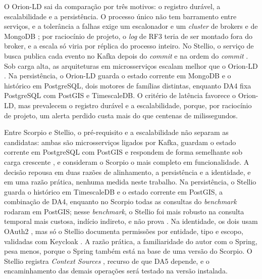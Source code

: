 O Orion-LD sai da comparação por três motivos: o registro durável, a escalabilidade e a persistência. O processo único não tem barramento entre serviços, e a tolerância a falhas exige um escalonador e um \textit{cluster} de brokers e de MongoDB \cite{ntallaris2024benchmarking}; por raciocínio de projeto, o \textit{log} de RF3 teria de ser montado fora do broker, e a escala só viria por réplica do processo inteiro. No Stellio, o serviço de busca publica cada evento no Kafka depois do \textit{commit} e na ordem do \textit{commit} \cite{stellio2025docs}. Sob carga alta, as arquiteturas em microsserviços escalam melhor que o Orion-LD \cite{ntallaris2024benchmarking}. Na persistência, o Orion-LD guarda o estado corrente em MongoDB e o histórico em PostgreSQL, dois motores de famílias distintas, enquanto DA4 fixa PostgreSQL com PostGIS e TimescaleDB. O critério de latência favorece o Orion-LD, mas prevalecem o registro durável e a escalabilidade, porque, por raciocínio de projeto, um alerta perdido custa mais do que centenas de milissegundos.

Entre Scorpio e Stellio, o pré-requisito e a escalabilidade não separam as candidatas: ambas são microsserviços ligados por Kafka, guardam o estado corrente em PostgreSQL com PostGIS e respondem de forma semelhante sob carga crescente \cite{ntallaris2024benchmarking,lazidis2022publish}, e  consideram o Scorpio o mais completo em funcionalidade. A decisão repousa em duas razões de alinhamento, a persistência e a identidade, e em uma razão prática, nenhuma medida neste trabalho. Na persistência, o Stellio guarda o histórico em TimescaleDB e o estado corrente em PostGIS, a combinação de DA4, enquanto no Scorpio todas as consultas do \textit{benchmark} rodaram em PostGIS; nesse \textit{benchmark}, o Stellio foi mais robusto na consulta temporal mais custosa, indício indireto, e não prova \cite{ntallaris2024benchmarking}. Na identidade, os dois usam OAuth2 \cite{lazidis2022publish}, mas só o Stellio documenta permissões por entidade, tipo e escopo, validadas com Keycloak \cite{stellio2025docs}. A razão prática, a familiaridade do autor com o Spring, pesa menos, porque o Spring também está na base de uma versão do Scorpio. O Stellio registra \textit{Context Sources} \cite{stellio2025docs}, recurso de que DA5 depende, e o encaminhamento das demais operações será testado na versão instalada.

